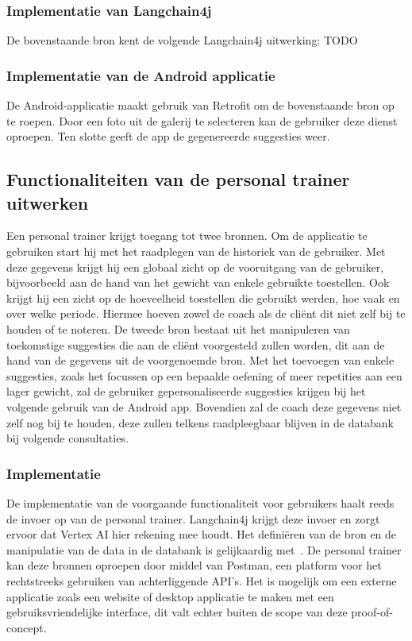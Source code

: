 \subsubsection{Implementatie van Langchain4j}
De bovenstaande bron kent de volgende Langchain4j uitwerking:
TODO %

\subsubsection{Implementatie van de Android applicatie}
De Android-applicatie maakt gebruik van Retrofit om de bovenstaande bron op te roepen.
Door een foto uit de galerij te selecteren kan de gebruiker deze dienst oproepen.
Ten slotte geeft de app de gegenereerde suggesties weer.

\subsection{Functionaliteiten van de personal trainer uitwerken}
\label{subsec:functionaliteiten-van-de-personal-trainer-uitwerken}
Een personal trainer krijgt toegang tot twee bronnen.
Om de applicatie te gebruiken start hij met het raadplegen van de historiek van de gebruiker.
Met deze gegevens krijgt hij een globaal zicht op de vooruitgang van de gebruiker, bijvoorbeeld aan de hand van het gewicht van enkele gebruikte toestellen.
Ook krijgt hij een zicht op de hoeveelheid toestellen die gebruikt werden, hoe vaak en over welke periode.
Hiermee hoeven zowel de coach als de cliënt dit niet zelf bij te houden of te noteren.
De tweede bron bestaat uit het manipuleren van toekomstige suggesties die aan de cliënt voorgesteld zullen worden, dit aan de hand van de gegevens uit de voorgenoemde bron.
Met het toevoegen van enkele suggesties, zoals het focussen op een bepaalde oefening of meer repetities aan een lager gewicht, zal de gebruiker gepersonaliseerde suggesties krijgen bij het volgende gebruik van de Android app.
Bovendien zal de coach deze gegevens niet zelf nog bij te houden, deze zullen telkens raadpleegbaar blijven in de databank bij volgende consultaties.

\subsubsection{Implementatie}
De implementatie van de voorgaande functionaliteit voor gebruikers haalt reeds de invoer op van de personal trainer.
Langchain4j krijgt deze invoer en zorgt ervoor dat Vertex AI hier rekening mee houdt.
Het definiëren van de bron en de manipulatie van de data in de databank is gelijkaardig met~.
De personal trainer kan deze bronnen oproepen door middel van Postman, een platform voor het rechtstreeks gebruiken van achterliggende API's.
Het is mogelijk om een externe applicatie zoals een website of desktop applicatie te maken met een gebruiksvriendelijke interface, dit valt echter buiten de scope van deze proof-of-concept.

